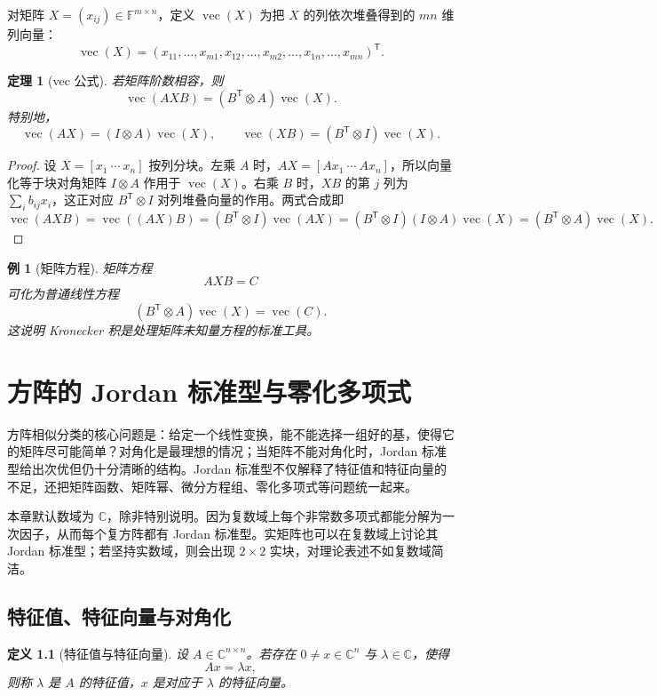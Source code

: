 \documentclass[UTF8,openany,zihao=-4]{ctexbook}
\theoremstyle{cnplain}
\newtheorem{definition}{定义}[chapter]
\newtheorem{theorem}{定理}[chapter]
\newtheorem{example}{例}[chapter]
\newcommand{\F}{\mathbb F}
\newcommand{\C}{\mathbb C}
\newcommand{\vect}{\operatorname{vec}}
\begin{document}
对矩阵 $X=(x_{ij})\in\F^{m\times n}$，定义 $\vect(X)$ 为把 $X$ 的列依次堆叠得到的 $mn$ 维列向量：
\[
\vect(X)=(x_{11},\ldots,x_{m1},x_{12},\ldots,x_{m2},\ldots,x_{1n},\ldots,x_{mn})^{\mathsf T}.
\]

\begin{theorem}[vec 公式]
若矩阵阶数相容，则
\[
\vect(AXB)=(B^{\mathsf T}\otimes A)\vect(X).
\]
特别地，
\[
\vect(AX)=(I\otimes A)\vect(X),
\qquad
\vect(XB)=(B^{\mathsf T}\otimes I)\vect(X).
\]
\end{theorem}

\begin{proof}
设 $X=[x_1\ \cdots\ x_n]$ 按列分块。左乘 $A$ 时，$AX=[Ax_1\ \cdots\ Ax_n]$，所以向量化等于块对角矩阵 $I\otimes A$ 作用于 $\vect(X)$。右乘 $B$ 时，$XB$ 的第 $j$ 列为 $\sum_i b_{ij}x_i$，这正对应 $B^{\mathsf T}\otimes I$ 对列堆叠向量的作用。两式合成即
\[
\vect(AXB)=\vect((AX)B)=(B^{\mathsf T}\otimes I)\vect(AX)=(B^{\mathsf T}\otimes I)(I\otimes A)\vect(X)=(B^{\mathsf T}\otimes A)\vect(X).
\]
\end{proof}

\begin{example}[矩阵方程]
矩阵方程
\[
AXB=C
\]
可化为普通线性方程
\[
(B^{\mathsf T}\otimes A)\vect(X)=\vect(C).
\]
这说明 Kronecker 积是处理矩阵未知量方程的标准工具。
\end{example}

\chapter{方阵的 Jordan 标准型与零化多项式}

方阵相似分类的核心问题是：给定一个线性变换，能不能选择一组好的基，使得它的矩阵尽可能简单？对角化是最理想的情况；当矩阵不能对角化时，Jordan 标准型给出次优但仍十分清晰的结构。Jordan 标准型不仅解释了特征值和特征向量的不足，还把矩阵函数、矩阵幂、微分方程组、零化多项式等问题统一起来。

本章默认数域为 $\C$，除非特别说明。因为复数域上每个非常数多项式都能分解为一次因子，从而每个复方阵都有 Jordan 标准型。实矩阵也可以在复数域上讨论其 Jordan 标准型；若坚持实数域，则会出现 $2\times2$ 实块，对理论表述不如复数域简洁。

\section{特征值、特征向量与对角化}

\begin{definition}[特征值与特征向量]
设 $A\in\C^{n\times n}$。若存在 $0\ne x\in\C^n$ 与 $\lambda\in\C$，使得
\[
Ax=\lambda x,
\]
则称 $\lambda$ 是 $A$ 的特征值，$x$ 是对应于 $\lambda$ 的特征向量。
\end{definition}
\end{document}
